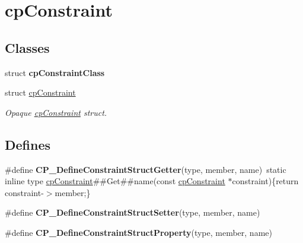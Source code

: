 \hypertarget{group__cp_constraint}{\section{cp\-Constraint}
\label{group__cp_constraint}
}
\subsection*{Classes}
\begin{DoxyCompactItemize}
\item 
struct {\bfseries cp\-Constraint\-Class}
\item 
struct \hyperlink{structcp_constraint}{cp\-Constraint}
\begin{DoxyCompactList}\small\item\em Opaque \hyperlink{structcp_constraint}{cp\-Constraint} struct. \end{DoxyCompactList}\end{DoxyCompactItemize}
\subsection*{Defines}
\begin{DoxyCompactItemize}
\item 
\hypertarget{group__cp_constraint_ga313a8c10c92b0df4b4080b7d02278c7d}{\#define {\bfseries C\-P\-\_\-\-Define\-Constraint\-Struct\-Getter}(type, member, name)~static inline type \hyperlink{structcp_constraint}{cp\-Constraint}\#\#Get\#\#name(const \hyperlink{structcp_constraint}{cp\-Constraint} $\ast$constraint)\{return constraint-\/$>$member;\}}\label{group__cp_constraint_ga313a8c10c92b0df4b4080b7d02278c7d}

\item 
\#define {\bfseries C\-P\-\_\-\-Define\-Constraint\-Struct\-Setter}(type, member, name)
\item 
\#define {\bfseries C\-P\-\_\-\-Define\-Constraint\-Struct\-Property}(type, member, name)
\end{DoxyCompactItemize}
